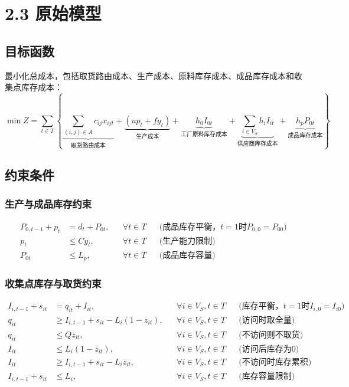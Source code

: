 \documentclass{article}
\begin{document}
\section{2.3 原始模型}

\subsection{目标函数}
最小化总成本，包括取货路由成本、生产成本、原料库存成本、成品库存成本和收集点库存成本：
\begin{equation}
\min Z = \sum_{t \in T} \left\{
\underbrace{\sum_{(i,j) \in A} c_{ij} x_{ijt}}_{\text{取货路由成本}}
+ \underbrace{(u p_t + f y_t)}_{\text{生产成本}}
+ \underbrace{h_0 I_{0t}}_{\text{工厂原料库存成本}}
+ \underbrace{\sum_{i \in V_S} h_i I_{it}}_{\text{供应商库存成本}}
+ \underbrace{h_p P_{0t}}_{\text{成品库存成本}}
\right\}
\end{equation}

\subsection{约束条件}

\subsubsection{生产与成品库存约束}
\vspace{-1.5ex}
\begin{align}
P_{0,t-1} + p_t &= d_t + P_{0t}, && \forall t \in T && \text{(成品库存平衡，$t=1$时$P_{0,0}=P_{00}$)} \\
p_t &\leq C y_t, && \forall t \in T && \text{(生产能力限制)} \\
P_{0t} &\leq L_p, && \forall t \in T && \text{(成品库存容量)}
\end{align}

\subsubsection{收集点库存与取货约束}
\vspace{-1.5ex}
\begin{align}
I_{i,t-1} + s_{it} &= q_{it} + I_{it}, && \forall i \in V_S, t \in T && \text{(库存平衡，$t=1$时$I_{i,0}=I_{i0}$)} \\
q_{it} &\geq I_{i,t-1} + s_{it} - L_i(1 - z_{it}), && \forall i \in V_S, t \in T && \text{(访问时取全量)} \\
q_{it} &\leq Q z_{it}, && \forall i \in V_S, t \in T && \text{(不访问则不取货)} \\
I_{it} &\leq L_i(1 - z_{it}), && \forall i \in V_S, t \in T && \text{(访问后库存为0)} \\
I_{it} &\geq I_{i,t-1} + s_{it} - L_i z_{it}, && \forall i \in V_S, t \in T && \text{(不访问时库存累积)} \\
I_{i,t-1} + s_{it} &\leq L_i, && \forall i \in V_S, t \in T && \text{(库存容量限制)}
\end{align}
\end{document}

